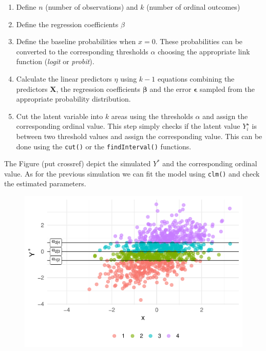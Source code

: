 \documentclass[
  man,floatsintext]{apa6}
\providecommand{\tightlist}{%
  \setlength{\itemsep}{0pt}\setlength{\parskip}{0pt}}
\begin{document}
\begin{enumerate}
\def\labelenumi{\arabic{enumi}.}
\tightlist
\item
  Define \(n\) (number of observations) and \(k\) (number of ordinal outcomes)
\item
  Define the regression coefficients \(\beta\)
\item
  Define the baseline probabilities when \(x = 0\). These probabilities can be converted to the corresponding thresholds \(\alpha\) choosing the appropriate link function (\emph{logit} or \emph{probit}).
\item
  Calculate the linear predictors \(\eta\) using \(k - 1\) equations combining the predictors \(\mathbf{X}\), the regression coefficients \(\boldsymbol{\beta}\) and the error \(\mathbf{\epsilon}\) sampled from the appropriate probability distribution.
\item
  Cut the latent variable into \(k\) areas using the thresholds \(\alpha\) and assign the corresponding ordinal value. This step simply checks if the latent value \(Y^{\star}_i\) is between two threshold values and assign the corresponding value. This can be done using the \texttt{cut()} or the \texttt{findInterval()} functions.
\end{enumerate}

\scriptsize

\normalsize

The Figure (put crossref) depict the simulated \(Y^{*}\) and the corresponding ordinal value. As for the previous simulation we can fit the model using \texttt{clm()} and check the estimated parameters.

\scriptsize

\begin{figure}

{\centering \includegraphics{paper-new_files/figure-latex/unnamed-chunk-14-1} 

}

\caption{ }\label{fig:unnamed-chunk-14}
\end{figure}
\end{document}
